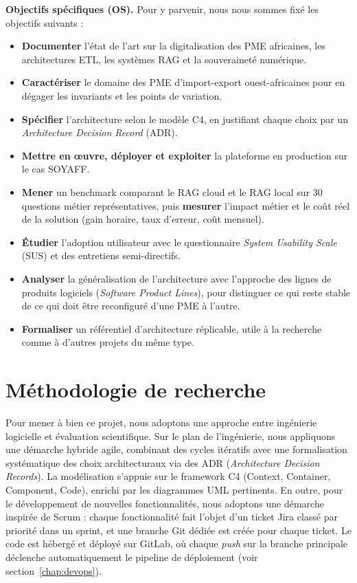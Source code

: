 \textbf{Objectifs spécifiques (OS).} Pour y parvenir, nous nous sommes fixé les objectifs suivants :
\begin{itemize}
    \item[\textbf{OS1}] \textbf{Documenter} l'état de l'art sur la digitalisation des PME africaines, les architectures ETL, les systèmes RAG et la souveraineté numérique.
    \item[\textbf{OS2}] \textbf{Caractériser} le domaine des PME d'import-export ouest-africaines pour en dégager les invariants et les points de variation.
    \item[\textbf{OS3}] \textbf{Spécifier} l'architecture selon le modèle C4, en justifiant chaque choix par un \textit{Architecture Decision Record} (ADR).
    \item[\textbf{OS4}] \textbf{Mettre en œuvre, déployer et exploiter} la plateforme en production sur le cas SOYAFF.
    \item[\textbf{OS5}] \textbf{Mener} un benchmark comparant le RAG cloud et le RAG local sur 30 questions métier représentatives, puis \textbf{mesurer} l'impact métier et le coût réel de la solution (gain horaire, taux d'erreur, coût mensuel).
    \item[\textbf{OS6}] \textbf{Étudier} l'adoption utilisateur avec le questionnaire \textit{System Usability Scale} (SUS) et des entretiens semi-directifs.
    \item[\textbf{OS7}] \textbf{Analyser} la généralisation de l'architecture avec l'approche des lignes de produits logiciels (\textit{Software Product Lines}), pour distinguer ce qui reste stable de ce qui doit être reconfiguré d'une PME à l'autre.
    \item[\textbf{OS8}] \textbf{Formaliser} un référentiel d'architecture réplicable, utile à la recherche comme à d'autres projets du même type.
\end{itemize}

\section{Méthodologie de recherche}
\label{sec:methodologie}

Pour mener à bien ce projet, nous adoptons une approche entre ingénierie logicielle et évaluation scientifique. Sur le plan de l'ingénierie, nous appliquons une démarche hybride agile, combinant des cycles itératifs avec une formalisation systématique des choix architecturaux via des ADR (\textit{Architecture Decision Records}). La modélisation s'appuie sur le framework C4 (Context, Container, Component, Code), enrichi par les diagrammes UML pertinents. En outre, pour le développement de nouvelles fonctionnalités, nous adoptons une démarche inspirée de Scrum : chaque fonctionnalité fait l'objet d'un ticket Jira classé par priorité dans un sprint, et une branche Git dédiée est créée pour chaque ticket. Le code est hébergé et déployé sur GitLab, où chaque \textit{push} sur la branche principale déclenche automatiquement le pipeline de déploiement (voir section~\ref{chap:devops}).

